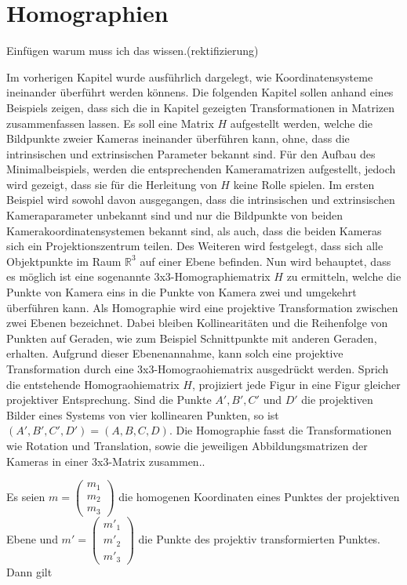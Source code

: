 \chapter{Homographien}
\label{sec:homographien} 


Einfügen warum muss ich das wissen.(rektifizierung)

Im vorherigen Kapitel  wurde ausführlich dargelegt, wie Koordinatensysteme ineinander überführt werden könnens. Die folgenden Kapitel sollen anhand eines Beispiels zeigen, dass sich die in Kapitel  gezeigten Transformationen in Matrizen zusammenfassen lassen. Es soll eine Matrix $H$ aufgestellt werden, welche die Bildpunkte zweier Kameras ineinander überführen kann, ohne, dass die intrinsischen und extrinsischen Parameter bekannt sind. Für den Aufbau des Minimalbeispiels, werden die entsprechenden Kameramatrizen aufgestellt, jedoch wird gezeigt, dass sie für die Herleitung von $H$ keine Rolle spielen. Im ersten Beispiel wird sowohl davon ausgegangen, dass die intrinsischen und extrinsischen Kameraparameter unbekannt sind und nur die Bildpunkte von beiden Kamerakoordinatensystemen bekannt sind, als auch, dass die beiden Kameras sich ein Projektionszentrum teilen.  Des Weiteren wird festgelegt, dass sich alle Objektpunkte im Raum $\mathbb{R}^3$ auf einer Ebene befinden. Nun wird behauptet, dass es möglich ist eine sogenannte 3x3-Homographiematrix $H$ zu ermitteln, welche die Punkte von Kamera eins in die Punkte von Kamera zwei und umgekehrt überführen kann. Als Homographie wird eine projektive Transformation zwischen zwei Ebenen bezeichnet. Dabei bleiben Kollinearitäten und die Reihenfolge von Punkten auf Geraden, wie zum Beispiel Schnittpunkte mit anderen Geraden, erhalten. Aufgrund dieser Ebenenannahme, kann solch eine projektive Transformation durch eine 3x3-Homograohiematrix ausgedrückt werden\cite{Roser}. Sprich die entstehende Homograohiematrix $H$, projiziert jede Figur in eine Figur gleicher projektiver Entsprechung\cite{HZ,Elements}. Sind die Punkte $A',B',C'$ und $D'$ die projektiven Bilder eines Systems von vier kollinearen Punkten, so ist $(A',B',C',D') = (A,B,C,D)$\cite{Peiffer}. Die Homographie fasst die Transformationen wie Rotation und Translation, sowie die jeweiligen Abbildungsmatrizen der Kameras in einer 3x3-Matrix zusammen.\cite{Elements,Peiffer}.
 
Es seien \ensuremath{m = \begin{pmatrix}
		m_1\\m_2\\m_3
\end{pmatrix}} die homogenen Koordinaten eines Punktes der projektiven Ebene und \ensuremath{m' = \begin{pmatrix}
m'_1\\m'_2\\m'_3
\end{pmatrix}} die Punkte des projektiv transformierten Punktes. Dann gilt

